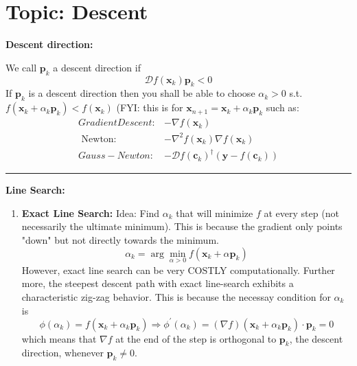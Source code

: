 \documentclass[11pt]{article}
\theoremstyle{plain} %
\newenvironment{topic}
{\color{C2}\normalfont\begin{framed}\begingroup }
  {\endgroup\end{framed}}
\theoremstyle{remark}
\begin{document}
\newpage
\section{Topic: Descent}
\begin{topic}

  \textbf{Descent direction:}

  We call $\mathbf{p}_k$ a descent direction if
  $$\mathcal{D} f\left(\mathbf{x}_k\right) \mathbf{p}_k<0$$
  If $\mathbf{p}_k$ is a descent direction then you shall be able to choose $\alpha_k>0$ s.t. $f\left(\mathbf{x}_k+\alpha_k \mathbf{p}_k\right)<f\left(\mathbf{x}_k\right)$
  (FYI: this is for $\mathbf{x}_{n+1}=\mathbf{x}_k+\alpha_k \mathbf{p}_k$ such as:
  $$
    \begin{aligned}
      Gradient Descent: & -\nabla f\left(\mathbf{x}_k\right)                                                                \\
      \text { Newton: } & -\nabla^2 f\left(\mathbf{x}_k\right) \nabla f\left(\mathbf{x}_k\right)                            \\
      Gauss-Newton:     & -\mathcal{D} f\left(\mathbf{c}_k\right)^\dagger\left(\mathbf{y}-f\left(\mathbf{c}_k\right)\right)
    \end{aligned}
  $$
  \vspace*{0.5em}

  \hrule

  \textbf{Line Search:}
  \begin{enumerate}
    \item \textbf{Exact Line Search:} Idea: Find $\alpha_k$ that will minimize $f$ at every step (not necessarily the ultimate minimum). This is because the gradient only points "down" but not directly towards the minimum.
          $$
            \alpha_k= \arg\min_{\alpha > 0} f\left(\mathbf{x}_k+\alpha \mathbf{p}_k\right)
          $$
          However, exact line search can be very COSTLY computationally. Further
          more, the steepest descent path with exact line-search exhibits a
          characteristic zig-zag behavior. This is because the necessay condition for $\alpha_k$ is
          \[
            \phi(\alpha_k)=f(\mathbf{x}_k+\alpha_k \mathbf{p}_k)
            \Longrightarrow
            \phi^{\prime}(\alpha_k)=(\nabla f)(\mathbf{x}_k+\alpha_k \mathbf{p}_k) \cdot \mathbf{p}_k=0
          \]
          which means that $\nabla f$ at the end of the step is orthogonal to
          $\mathbf{p}_k$, the descent direction, whenever $\mathbf{p}_k \neq 0$.


\end{enumerate}
\end{topic}
\end{document}
